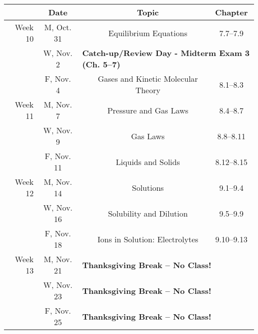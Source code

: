 \documentclass[12pt, letterpaper]{article}
\begin{document}
\noindent\begin{tabular}{rcccc}
	            & Date       &                                                                                  & Topic                              & Chapter      \\
	\midrule
	Week 10     & M, Oct. 31 &                                                                                  & Equilibrium Equations              & 7.7--7.9     \\
	            & W, Nov. 2  & \multicolumn{3}{l}{\textbf{Catch-up/Review Day - Midterm Exam 3 (Ch. 5--7)}}                                                         \\
	            & F, Nov. 4  &                                                                                  & Gases and Kinetic Molecular Theory & 8.1--8.3     \\
	\midrule
	Week 11     & M, Nov. 7  &                                                                                  & Pressure and Gas Laws              & 8.4--8.7     \\
	            & W, Nov. 9  &                                                                                  & Gas Laws                           & 8.8--8.11    \\
	            & F, Nov. 11 &                                                                                  & Liquids and Solids                 & 8.12--8.15   \\
	\midrule
	Week 12     & M, Nov. 14 &                                                                                  & Solutions                          & 9.1--9.4     \\
	            & W, Nov. 16 &                                                                                  & Solubility and Dilution            & 9.5--9.9     \\
	            & F, Nov. 18 &                                                                                  & Ions in Solution: Electrolytes     & 9.10--9.13   \\
	\midrule
	Week 13     & M, Nov. 21 & \multicolumn{3}{l}{\textbf{Thanksgiving Break -- No Class!}}                                                                         \\
	            & W, Nov. 23 & \multicolumn{3}{l}{\textbf{Thanksgiving Break -- No Class!}}                                                                         \\
	            & F, Nov. 25 & \multicolumn{3}{l}{\textbf{Thanksgiving Break -- No Class!}}                                                                         \\

\end{tabular}
\end{document}

